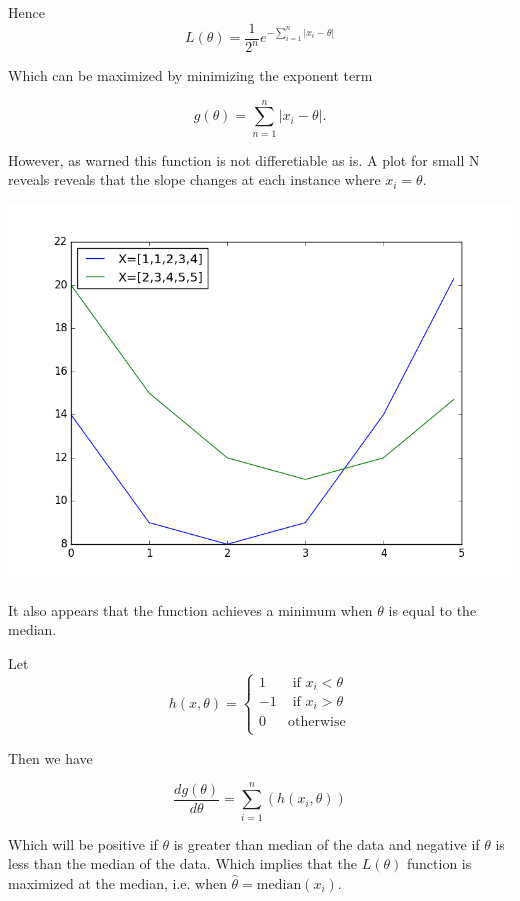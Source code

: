 \documentclass{tufte-book}
\theoremstyle{mytheoremstyle}
\theoremstyle{mylemstyle}
\theoremstyle{mydefstyle}
\begin{document}
Hence
\[ L(\theta) = \frac{1}{2^n} e^{-\sum_{i=1}^n|x_i -\theta|} \]

Which can be maximized by minimizing the exponent term

\[ g(\theta) = \sum_{n=1}^n |x_i-\theta|. \]

However, as warned this function is not differetiable as is.  A plot for small N reveals reveals that the slope changes at each instance where $x_i=\theta$.

\includegraphics{q8.png}

It also appears that the function achieves a minimum when $\theta$ is equal to the median.

Let
\[ h(x, \theta) =
\begin{cases}
1 &\text { if }  x_i < \theta \\
-1 &\text { if } x_i > \theta \\
0 &\text {otherwise}\\
\end{cases}
\]

Then we have

\[ \frac{d g(\theta)}{d\theta} = \sum_{i=1}^n(h(x_i, \theta)) \]

Which will be positive if $\theta$ is greater than median of the data and negative if $\theta$ is less than the median of the data.  Which implies that the $L(\theta)$ function is maximized at the median, i.e. when $\hat{\theta} = \text{median}(x_i)$.
\end{document}
